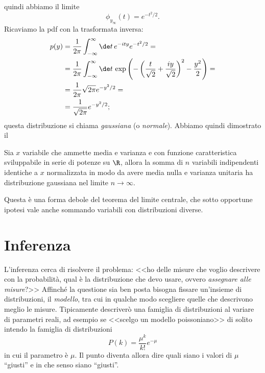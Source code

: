 quindi abbiamo il limite
\begin{equation*}
	\phi_{y_\infty}(t) = e^{-t^2/2}.
\end{equation*}
Ricaviamo la pdf con la trasformata inversa:
\begin{align*}
	p(y)
	&= \frac1{2\pi} \int_{-\infty}^\infty \de t\, e^{-ity} e^{-t^2/2} = \\
	&= \frac1{2\pi} \int_{-\infty}^\infty \de t\,
	\exp\left( -\left(\frac t{\sqrt 2} + \frac{iy}{\sqrt 2}\right)^2 - \frac{y^2}2 \right) = \\
	&= \frac1{2\pi} \sqrt{2\pi} e^{-y^2/2} = \\
	&= \frac1{\sqrt{2\pi}} e^{-y^2/2};
\end{align*}
questa distribuzione si chiama \emph{gaussiana} (o \emph{normale}).
Abbiamo quindi dimostrato il
\begin{theorem}
	\label{th:limitecentrale}
	Sia $x$ variabile che ammette media e varianza e con funzione caratteristica sviluppabile in serie di potenze su $\R$,
	allora la somma di $n$ variabili indipendenti identiche a $x$ normalizzata in modo da avere media nulla e varianza unitaria ha distribuzione gaussiana nel limite $n\to\infty$.
\end{theorem}
Questa è una forma debole del teorema del limite centrale, che sotto opportune ipotesi vale anche sommando variabili con distribuzioni diverse.

\chapter{Inferenza}

L'inferenza cerca di risolvere il problema:
<<ho delle misure che voglio descrivere con la probabilità,
qual è la distribuzione che devo usare, ovvero \emph{assegnare alle misure}?>>
Affinché la questione sia ben posta bisogna fissare un'insieme di distribuzioni, il \emph{modello},
tra cui in qualche modo scegliere quelle che descrivono meglio le misure.
Tipicamente descriverò una famiglia di distribuzioni al variare di parametri reali,
ad esempio se <<scelgo un modello poissoniano>> di solito intendo la famiglia di distribuzioni
\begin{equation*}
	P(k) = \frac{\mu^k}{k!}e^{-\mu}
\end{equation*}
in cui il parametro è $\mu$.
Il punto diventa allora dire quali siano i valori di $\mu$ ``giusti'' e in che senso siano ``giusti''.

